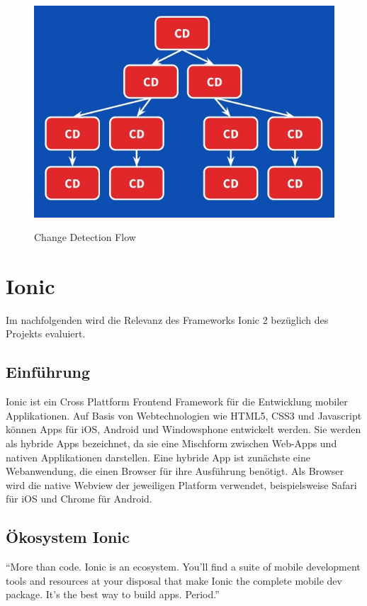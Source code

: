 \begin{figure}[ht]
 \centering
 \includegraphics[width=0.7\linewidth]{kapitel3/cd-tree.jpg}
 \caption{Change Detection Flow}\cite{changedetection-explained}
\end{figure}

\newpage
\section{Ionic}

Im nachfolgenden wird die Relevanz des Frameworks Ionic 2 bezüglich des Projekts \projectname{} evaluiert.

\subsection{Einführung}

Ionic ist ein Cross Plattform Frontend Framework für die Entwicklung mobiler Applikationen.
Auf Basis von Webtechnologien wie HTML5, CSS3 und Javascript können Apps für iOS, Android und Windowsphone
entwickelt werden. Sie werden als hybride Apps bezeichnet,
da sie eine Mischform zwischen Web-Apps und nativen Applikationen darstellen.
Eine hybride App ist zunächste eine Webanwendung, die einen Browser für ihre Ausführung benötigt.
Als Browser wird die native Webview der jeweiligen Platform verwendet,
beispielsweise Safari für iOS und Chrome für Android.

\subsection{Ökosystem Ionic}

``More than code. Ionic is an ecosystem. You'll find a suite of mobile development tools and resources at your disposal that make
Ionic the complete mobile dev package. It's the best way to build apps. Period.'' \cite{Ionic20:online}
\vspace{0.5cm}

